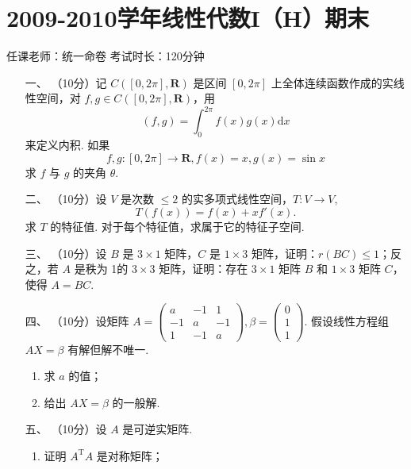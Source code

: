 \section*{2009-2010学年线性代数I（H）期末}

\begin{center}
    任课老师：统一命卷\hspace{4em} 考试时长：120分钟
\end{center}

\begin{enumerate}
    \item [一、]（10分）记 $C([0,2\pi],\mathbf{R})$ 是区间 $[0,2\pi]$ 上全体连续函数作成的实线性空间，对 $f,g \in C([0,2\pi],\mathbf{R})$，用
    \[(f,g) = \displaystyle\int_0^{2\pi}f(x)g(x)\mathrm{d}x\]
    来定义内积. 如果
    \[f,g:[0,2\pi] \to \mathbf{R},f(x)=x,g(x)=\sin x\]
    求 $f$ 与 $g$ 的夹角 $\theta$.

    \item[二、]（10分）设 $V$ 是次数 $\leq 2$ 的实多项式线性空间，$T:V\to V$,
    \[T(f(x)) = f(x) + xf'(x).\]
    求 $T$ 的特征值. 对于每个特征值，求属于它的特征子空间.

    \item[三、]（10分）设 $B$ 是 $3\times 1$ 矩阵，$C$ 是 $1\times 3$ 矩阵，证明：$r(BC)\leq 1$；反之，若 $A$ 是秩为 1的 $3\times 3$ 矩阵，证明：存在 $3\times 1$ 矩阵 $B$ 和 $1\times 3$ 矩阵 $C$，使得 $A=BC$.

    \item[四、]（10分）设矩阵 $A=\begin{pmatrix}a & -1 & 1 \\ -1 & a & -1 \\ 1 & -1 & a\end{pmatrix},\beta =\begin{pmatrix}0 \\ 1 \\ 1\end{pmatrix}$. 假设线性方程组 $AX=\beta$ 有解但解不唯一.
    \begin{enumerate}[label=(\arabic*)]
        \item 求 $a$ 的值；

        \item 给出 $AX=\beta$ 的一般解.
    \end{enumerate}

\item[五、]（10分）设 $A$ 是可逆实矩阵.
    \begin{enumerate}[label=(\arabic*)]
        \item 证明 $A^{\mathrm{T}}A$ 是对称矩阵；


\end{enumerate}
\end{enumerate}
